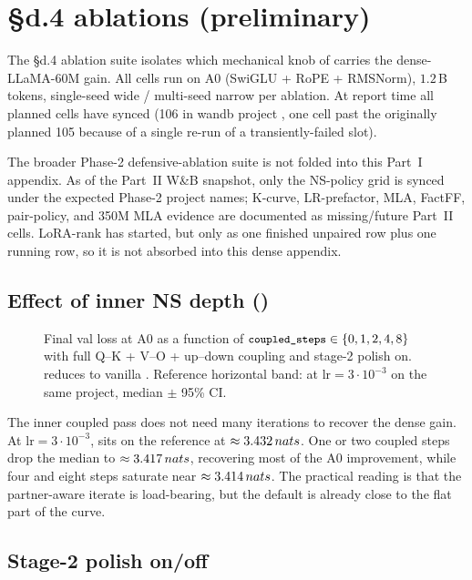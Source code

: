 \section{\S d.4 ablations (preliminary)}\label{app:d4}

The \S d.4 ablation suite isolates which mechanical knob of \optCoupled{} carries the dense-LLaMA-60M gain. All cells run on A0 (SwiGLU + RoPE + RMSNorm), $1.2$\,B tokens, single-seed wide / multi-seed narrow per ablation. At report time all planned cells have synced (106 in wandb project , one cell past the originally planned 105 because of a single re-run of a transiently-failed slot).

The broader Phase-2 defensive-ablation suite is not folded into this Part~I appendix. As of the Part~II W\&B snapshot, only the NS-policy grid is synced under the expected Phase-2 project names; K-curve, LR-prefactor, MLA, FactFF, pair-policy, and 350M MLA evidence are documented as missing/future Part~II cells. LoRA-rank has started, but only as one finished unpaired row plus one running row, so it is not absorbed into this dense appendix.

\subsection{Effect of inner NS depth ()}

\begin{figure}[h]
\centering
{}
\caption{Final val loss at A0 as a function of $\texttt{\small coupled\_steps}\in\{0,1,2,4,8\}$ with full Q--K + V--O + up--down coupling and stage-2 polish on.  reduces to vanilla \optMuon. Reference horizontal band: \optMuon{} at $\mathrm{lr}{=}3\!\cdot\!10^{-3}$ on the same project, median $\pm$ 95\% CI.}\label{fig:d4-coupled-steps}
\end{figure}

The inner coupled pass does not need many iterations to recover the dense gain. At $\mathrm{lr}=3\!\cdot\!10^{-3}$,  sits on the \optMuon{} reference at $\approx 3.432\,nats{}$. One or two coupled steps drop the median to $\approx 3.417\,nats{}$, recovering most of the A0 improvement, while four and eight steps saturate near $\approx 3.414\,nats{}$. The practical reading is that the partner-aware iterate is load-bearing, but the default  is already close to the flat part of the curve.

\subsection{Stage-2 polish on/off}


